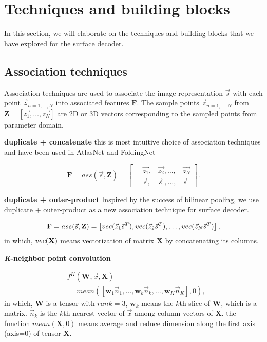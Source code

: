 \section{Techniques and building blocks}
In this section, we will elaborate on the techniques and building blocks that we have explored for the surface decoder. 
\subsection{Association techniques}
Association techniques are used to associate the image representation $\vec{s}$ with each point $\vec{z}_{n={1,\dots,N}}$ into associated features $\mathbf{F}$. The sample points $\vec{z}_{n={1,\dots,N}}$ from $\mathbf{Z}=[\vec{z_1},\dots,\vec{z_N}]$ are 2D or 3D vectors corresponding to the sampled points from parameter domain.

\noindent\textbf{duplicate + concatenate}
this is most intuitive choice of association techniques and have been used in AtlasNet\cite{atlasnet} and FoldingNet\cite{foldingnet}

\begin{equation}
\mathbf{F}=ass(\vec{s},\mathbf{Z})=\left[
\begin{aligned}
~&\vec{z_1},&\vec{z_2},\dots,&\vec{z_N}\\
~&\vec{s}  ,&\vec{s}~,\dots,&\vec{s}
\end{aligned}
\right].
\end{equation}

\noindent\textbf{duplicate + outer-product} 
Inspired by the success of bilinear pooling, we use duplicate + outer-product as a new association technique for surface decoder. 

\begin{equation}
\mathbf{F}=ass(\vec{s},\mathbf{Z})=\left[
~\\vec(\vec{z}_1\vec{s}^T),\\vec(\vec{z}_2\vec{s}^T),\dots,\\vec(\vec{z}_N\vec{s}^T)\\
\right],
\end{equation}in which, $\\vec(\mathbf{X})$ means vectorization of matrix $\mathbf{X}$ by concatenating its columns.

\noindent\textbf{\emph{K}-neighbor point convolution}

\begin{equation}
\begin{aligned}
&f^{K}(\mathbf{W},\vec{x},\mathbf{X})\\
&= mean([\mathbf{w}_1\vec{n}_{1},\dots,\mathbf{w}_k\vec{n}_{k},\dots,\mathbf{w}_K\vec{n}_{K}],0),
\end{aligned}
\end{equation}
in which, $\mathbf{W}$ is a tensor with $rank=3$, $\mathbf{w}_k$ means the $k$th slice of $\mathbf{W}$, which is a matrix. $\vec{n}_{k}$ is the $k$th nearest vector of $\vec{x}$ among column vectors of $\mathbf{X}$.
the function $mean(\mathbf{X},0)$ means average and reduce dimension along the first axis (axis=0) of tensor $\mathbf{X}$.

